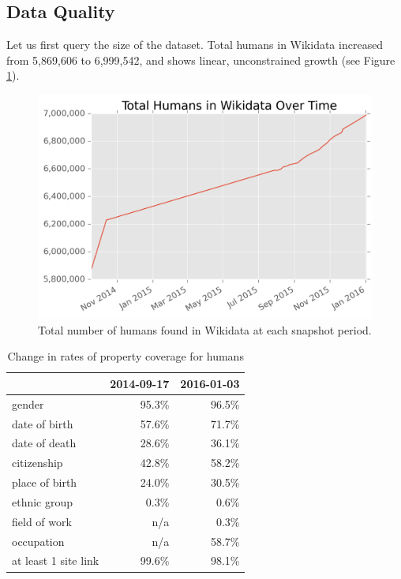 \documentclass[letterpaper]{article}
\begin{document}
\subsection{Data Quality}
Let us first query the size of the dataset. Total humans in Wikidata increased from 5,869,606 to 6,999,542, and shows linear, unconstrained growth (see Figure \ref{fig:totalhumans}).

\begin{figure}
\includegraphics[scale=0.6]{figures/totalhumans.png} 
\caption{Total number of humans found in Wikidata at each snapshot period.}
\label{fig:totalhumans}
\end{figure}

\begin{table}
\caption{Change in rates of property coverage for humans}
\begin{tabular}{lrr}
\toprule
{} &  2014-09-17 &  2016-01-03 \\
\midrule
gender               &       95.3\% &       96.5\% \\
date of birth        &       57.6\% &       71.7\% \\
date of death        &       28.6\% &       36.1\% \\
citizenship          &       42.8\% &       58.2\% \\
place of birth       &       24.0\% &       30.5\% \\
ethnic group         &        0.3\% &        0.6\% \\
field of work        &        n/a &        0.3\% \\
occupation           &        n/a &       58.7\% \\
at least 1 site link &       99.6\% &       98.1\% \\
\bottomrule
\end{tabular}
\label{table:accompanying}
\end{table}
\end{document}
